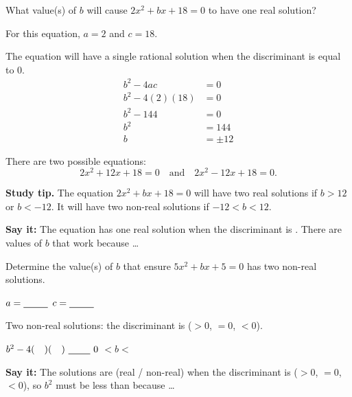 \newpage

What value(s) of $b$ will cause $2x^2+bx+18=0$ to have one real solution?

\begin{minipage}[t]{0.48\textwidth}
\vspace{0pt}
For this equation, $a=2$ and $c=18$.

The equation will have a single rational solution when the discriminant is equal to $0$.
\begin{align*}
b^2-4ac&=0\\
b^2-4(2)(18)&=0\\
b^2-144&=0\\
b^2&=144\\
b&=\pm12
\end{align*}
\end{minipage}\hfill
\begin{minipage}[t]{0.48\textwidth}
\vspace{0pt}
There are two possible equations:
\[2x^2+12x+18=0\quad\text{and}\quad 2x^2-12x+18=0.\]

\textbf{Study tip.} The equation $2x^2+bx+18=0$ will have two real solutions if $b>12$ or $b<-12$. It will have two non-real solutions if $-12<b<12$.
\end{minipage}

\vspace{4pt}
\textbf{Say it:} The equation has one real solution when the discriminant is \blank[1.2cm]. There are \blank[1.2cm] values of $b$ that work because \dots\lines[2]

Determine the value(s) of $b$ that ensure $5x^2+bx+5=0$ has two non-real solutions.

\begin{minipage}[t]{0.48\textwidth}
\vspace{2pt}
$a=\blank[0.9cm]$ \quad $c=\blank[0.9cm]$

\vspace{4pt}
Two non-real solutions: the discriminant is \blank[1.2cm] ($>0$, $=0$, $<0$).

\vspace{4pt}
$b^2-4(\phantom{00})(\phantom{00})\ \blank[0.8cm]\ 0$
\lines[4]
\blank[1.2cm] $<b<$ \blank[1.2cm]
\end{minipage}\hfill
\begin{minipage}[t]{0.48\textwidth}
\vspace{2pt}
\textbf{Say it:} The solutions are \blank[2cm] (real / non-real) when the discriminant is \blank[1.6cm] ($>0$, $=0$, $<0$), so $b^2$ must be less than \blank[1.2cm] because \dots\lines[3]
\end{minipage}

